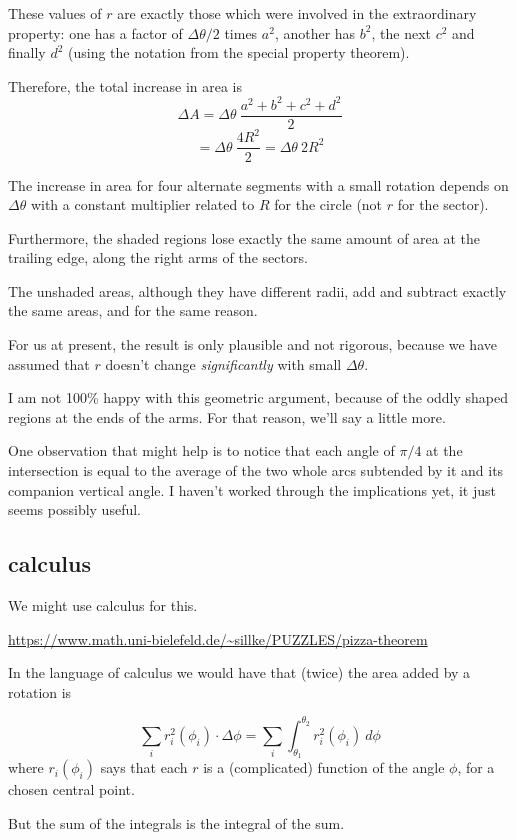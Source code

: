 \documentclass[11pt, oneside]{article}
\begin{document}
These values of $r$ are exactly those which were involved in the extraordinary property:  one has a factor of $\Delta \theta/2$ times $a^2$, another has $b^2$, the next $c^2$ and finally $d^2$ (using the notation from the special property theorem).

Therefore, the total increase in area is
\[ \Delta A = \Delta \theta \ \frac{a^2 + b^2 + c^2 + d^2}{2} \]
\[ = \Delta \theta \ \frac{4R^2}{2} = \Delta \theta \ 2R^2 \]

The increase in area for four alternate segments with a small rotation depends on $\Delta \theta$ with a constant multiplier related to $R$ for the circle (not $r$ for the sector).

Furthermore, the shaded regions lose exactly the same amount of area at the trailing edge, along the right arms of the sectors.

The unshaded areas, although they have different radii, add and subtract exactly the same areas, and for the same reason.

For us at present, the result is only plausible and not rigorous, because we have assumed that $r$ doesn't change \emph{significantly} with small $\Delta \theta$.  

I am not 100\% happy with this geometric argument, because of the oddly shaped regions at the ends of the arms.  For that reason, we'll say a little more.

One observation that might help is to notice that each angle of $\pi/4$ at the intersection is equal to the average of the two whole arcs subtended by it and its companion vertical angle.  I haven't worked through the implications yet, it just seems possibly useful.

\subsection*{calculus}

We might use calculus for this.

\url{https://www.math.uni-bielefeld.de/~sillke/PUZZLES/pizza-theorem}

In the language of calculus we would have that (twice) the area added by a rotation is

\[ \sum_i r_i^2 (\phi_i) \cdot \Delta \phi = \sum_i  \int_{\theta_1}^{\theta_2} r_i^2 (\phi_i) \ d \phi \]
where $r_i(\phi_i)$ says that each $r$ is a (complicated) function of the angle $\phi$, for a chosen central point.

But the sum of the integrals is the integral of the sum.  
\end{document}
